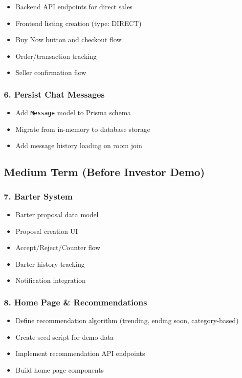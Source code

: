 \documentclass[12pt,a4paper]{article}
\begin{document}
\begin{itemize}
    \item Backend API endpoints for direct sales
    \item Frontend listing creation (type: DIRECT)
    \item Buy Now button and checkout flow
    \item Order/transaction tracking
    \item Seller confirmation flow
\end{itemize}

\subsubsection{6. Persist Chat Messages}

\begin{itemize}
    \item Add \texttt{Message} model to Prisma schema
    \item Migrate from in-memory to database storage
    \item Add message history loading on room join
\end{itemize}

\subsection{Medium Term (Before Investor Demo)}

\subsubsection{7. Barter System}

\begin{itemize}
    \item Barter proposal data model
    \item Proposal creation UI
    \item Accept/Reject/Counter flow
    \item Barter history tracking
    \item Notification integration
\end{itemize}

\subsubsection{8. Home Page \& Recommendations}

\begin{itemize}
    \item Define recommendation algorithm (trending, ending soon, category-based)
    \item Create seed script for demo data
    \item Implement recommendation API endpoints
    \item Build home page components
\end{itemize}
\end{document}

